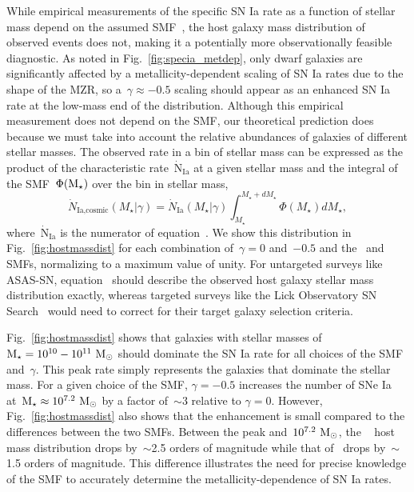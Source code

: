 \documentclass[foo.tex]{subfiles}
\begin{document}
While empirical measurements of the specific SN Ia rate as a function of
stellar mass depend on the assumed SMF~\citep{Gandhi2022}, the host galaxy
mass distribution of observed events does not, making it a potentially more
observationally feasible diagnostic.
As noted in Fig.~\ref{fig:specia_metdep}, only dwarf galaxies are
significantly affected by a metallicity-dependent scaling of SN Ia rates due to
the shape of the MZR, so a~$\gamma \approx -0.5$ scaling should appear as an
enhanced SN Ia rate at the low-mass end of the distribution.
Although this empirical measurement does not depend on the SMF, our theoretical
prediction does because we must take into account the relative abundances of
galaxies of different stellar masses.
The observed rate in a bin of stellar mass can be expressed as the product
of the characteristic rate~$\dot{\text{N}}_\text{Ia}$ at a given stellar mass
and the integral of the SMF~$\Phi(\text{M}_\star)$ over the bin in stellar mass,
\begin{equation}
\dot{N}_\text{Ia,cosmic}(M_\star | \gamma) = \dot{N}_\text{Ia}(M_\star | \gamma)
\int_{M_\star}^{M_\star + dM_\star} \Phi(M_\star) dM_\star,
\label{eq:hostmassdist}
\end{equation}
where~$\dot{\text{N}}_\text{Ia}$ is the numerator of equation~.
We show this distribution in Fig.~\ref{fig:hostmassdist} for each combination
of~$\gamma = 0$ and~$-0.5$ and the~\citet{Bell2003} and~\citet{Baldry2012} SMFs,
normalizing to a maximum value of unity.
For untargeted surveys like ASAS-SN, equation~ should
describe the observed host galaxy stellar mass distribution exactly, whereas
targeted surveys like the Lick Observatory SN Search~\citep[LOSS;][]{Li2000,
Filippenko2001} would need to correct for their target galaxy selection
criteria.
\par
Fig.~\ref{fig:hostmassdist} shows that galaxies with stellar masses of
$\text{M}_\star = 10^{10} - 10^{11}~\text{M}_\odot$ should dominate the SN Ia rate for all
choices of the SMF and~$\gamma$.
This peak rate simply represents the galaxies that dominate the stellar mass.
For a given choice of the SMF, $\gamma = -0.5$ increases the number of SNe Ia
at~$\text{M}_\star \approx 10^{7.2}~\text{M}_\odot$ by a factor of~$\sim$3 relative to
$\gamma = 0$.
However, Fig.~\ref{fig:hostmassdist} also shows that the enhancement is small
compared to the differences between the two SMFs.
Between the peak and~$10^{7.2}~\text{M}_\odot$, the ~\citet{Bell2003} host mass
distribution drops by~$\sim$2.5 orders of magnitude while
that of~\citet{Baldry2012} drops by~$\sim$1.5 orders of magnitude.
This difference illustrates the need for precise knowledge of the
SMF to accurately determine the metallicity-dependence of SN Ia rates.



\end{document}
